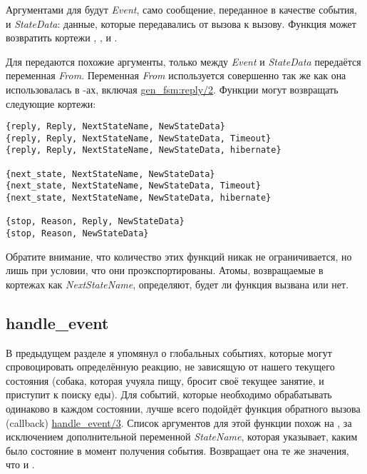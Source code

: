 Аргументами для  будут \emph{Event}, само сообщение, переданное в качестве события, и \emph{StateData}: данные, которые передавались от вызова к вызову.
Функция  может возвратить кортежи , ,  и .

Для  передаются похожие аргументы, только между \emph{Event} и \emph{StateData} передаётся переменная \emph{From}.
Переменная \emph{From} используется совершенно так же как она использовалась в \--ах, включая \href{http://erldocs.com/R15B/stdlib/gen\_fsm.html\#reply/2}{gen\_fsm:reply/2}.
Функции  могут возвращать следующие кортежи:
\begin{lstlisting}[style=erlang]
{reply, Reply, NextStateName, NewStateData}
{reply, Reply, NextStateName, NewStateData, Timeout}
{reply, Reply, NextStateName, NewStateData, hibernate}

{next_state, NextStateName, NewStateData}
{next_state, NextStateName, NewStateData, Timeout}
{next_state, NextStateName, NewStateData, hibernate}

{stop, Reason, Reply, NewStateData}
{stop, Reason, NewStateData}
\end{lstlisting}

Обратите внимание, что количество этих функций никак не ограничивается, но лишь при условии, что они проэкспортированы.
Атомы, возвращаемые в кортежах как \emph{NextStateName}, определяют, будет ли функция вызвана или нет.

\subsection{handle\_event}
\label{handle-event}
В предыдущем разделе я упомянул о глобальных событиях, которые могут спровоцировать определённую реакцию, не зависящую от нашего текущего состояния (собака, которая учуяла пищу, бросит своё текущее занятие, и приступит к поиску еды).
Для событий, которые необходимо обрабатывать одинаково в каждом состоянии, лучше всего подойдёт функция обратного вызова (callback) \href{http://erldocs.com/R15B/stdlib/gen\_fsm.html\#handle\_event/3}{handle\_event/3}.
Список аргументов для этой функции похож на , за исключением дополнительной переменной \emph{StateName}, которая указывает, каким было состояние в момент получения события.
Возвращает она те же значения, что и .
